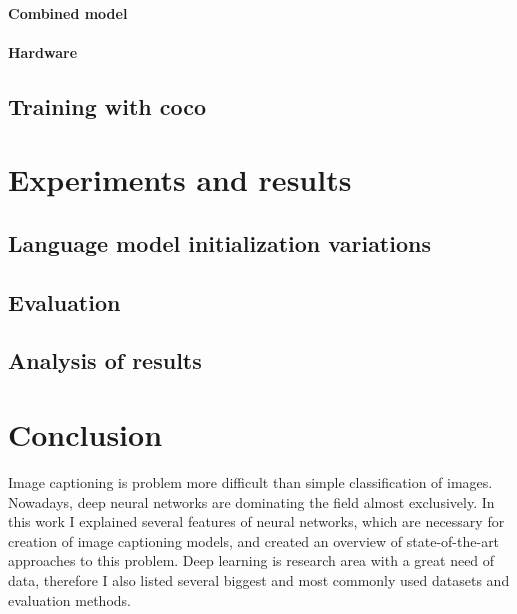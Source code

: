 \subsubsection{Combined model}

\subsubsection{Hardware}

\section{Training with \gls{coco}}

\chapter{Experiments and results}\label{chp:experiments}

\section{Language model initialization variations}
\section{Evaluation}
\section{Analysis of results}

\chapter{Conclusion}\label{chp:conclusion}


Image captioning is problem more difficult than simple classification of images. Nowadays, deep neural networks are dominating the field almost exclusively. In this work I explained several features of neural networks, which are necessary for creation of image captioning models, and created an overview of state-of-the-art approaches to this problem. Deep learning is research area with a great need of data, therefore I also listed several biggest and most commonly used datasets and evaluation methods.

